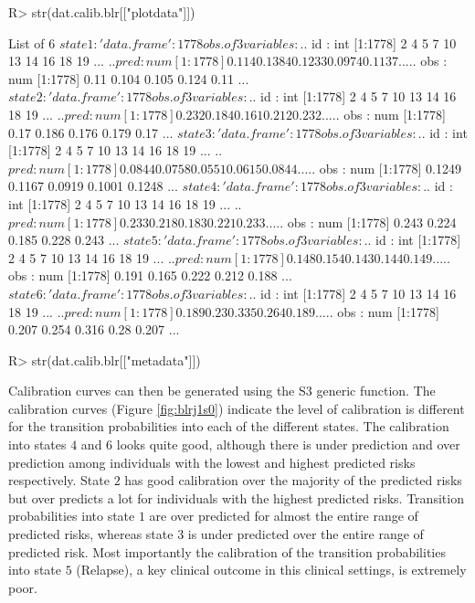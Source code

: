 \documentclass[nojss]{jss}
\begin{document}
\begin{Schunk}
\begin{Sinput}
R> str(dat.calib.blr[["plotdata"]])
\end{Sinput}
\begin{Soutput}
List of 6
 $ state1:'data.frame':	1778 obs. of  3 variables:
  ..$ id  : int [1:1778] 2 4 5 7 10 13 14 16 18 19 ...
  ..$ pred: num [1:1778] 0.114 0.1384 0.1233 0.0974 0.1137 ...
  ..$ obs : num [1:1778] 0.11 0.104 0.105 0.124 0.11 ...
 $ state2:'data.frame':	1778 obs. of  3 variables:
  ..$ id  : int [1:1778] 2 4 5 7 10 13 14 16 18 19 ...
  ..$ pred: num [1:1778] 0.232 0.184 0.161 0.212 0.232 ...
  ..$ obs : num [1:1778] 0.17 0.186 0.176 0.179 0.17 ...
 $ state3:'data.frame':	1778 obs. of  3 variables:
  ..$ id  : int [1:1778] 2 4 5 7 10 13 14 16 18 19 ...
  ..$ pred: num [1:1778] 0.0844 0.0758 0.0551 0.0615 0.0844 ...
  ..$ obs : num [1:1778] 0.1249 0.1167 0.0919 0.1001 0.1248 ...
 $ state4:'data.frame':	1778 obs. of  3 variables:
  ..$ id  : int [1:1778] 2 4 5 7 10 13 14 16 18 19 ...
  ..$ pred: num [1:1778] 0.233 0.218 0.183 0.221 0.233 ...
  ..$ obs : num [1:1778] 0.243 0.224 0.185 0.228 0.243 ...
 $ state5:'data.frame':	1778 obs. of  3 variables:
  ..$ id  : int [1:1778] 2 4 5 7 10 13 14 16 18 19 ...
  ..$ pred: num [1:1778] 0.148 0.154 0.143 0.144 0.149 ...
  ..$ obs : num [1:1778] 0.191 0.165 0.222 0.212 0.188 ...
 $ state6:'data.frame':	1778 obs. of  3 variables:
  ..$ id  : int [1:1778] 2 4 5 7 10 13 14 16 18 19 ...
  ..$ pred: num [1:1778] 0.189 0.23 0.335 0.264 0.189 ...
  ..$ obs : num [1:1778] 0.207 0.254 0.316 0.28 0.207 ...
\end{Soutput}
\begin{Sinput}
R> str(dat.calib.blr[["metadata"]])
\end{Sinput}
\end{Schunk}

Calibration curves can then be generated using the S3 generic  function. The calibration curves (Figure \ref{fig:blrj1s0}) indicate the level of calibration is different for the transition probabilities into each of the different states. The calibration into states $4$ and $6$ looks quite good, although there is under prediction and over prediction among individuals with the lowest and highest predicted risks respectively. State $2$ has good calibration over the majority of the predicted risks but over predicts a lot for individuals with the highest predicted risks. Transition probabilities into state $1$ are over predicted for almost the entire range of predicted risks, whereas state $3$ is under predicted over the entire range of predicted risk. Most importantly the calibration of the transition probabilities into state $5$ (Relapse), a key clinical outcome in this clinical settings, is extremely poor.
\end{document}
